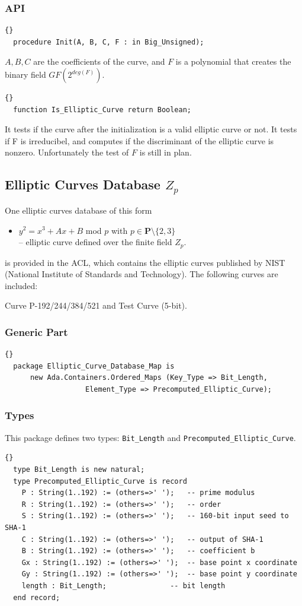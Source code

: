 \subsubsection*{API}
\begin{lstlisting}{}
  procedure Init(A, B, C, F : in Big_Unsigned);
\end{lstlisting}
$A,B,C$ are the coefficients of the curve, and $F$ is a polynomial
that creates the binary field $GF(2^{deg(F)})$.

\hhline

\begin{lstlisting}{}
  function Is_Elliptic_Curve return Boolean;
\end{lstlisting}
It tests if the curve after the initialization is a valid elliptic
curve or not. It tests if F is irreducibel, and computes if the
discriminant of the elliptic curve is nonzero. Unfortunately the test
of $F$ is still in plan.\\
\subsection{Elliptic Curves Database $Z_p$}
One elliptic curves database of this form
\begin{itemize}
\item $y^2 = x^3 + Ax + B$ mod $p$ with $p \in \textbf{P} \setminus \{2,3\}$ \\
      -- elliptic curve defined over the finite field $Z_p$.
\end{itemize}
is provided in the ACL, which contains the elliptic curves published
by NIST (National Institute of Standards and Technology). The
following curves are included: 
\begin{center}
Curve P-192/244/384/521 and Test Curve (5-bit).
\end{center}


\subsubsection*{Generic Part}
\begin{lstlisting}{}
  package Elliptic_Curve_Database_Map is
      new Ada.Containers.Ordered_Maps (Key_Type => Bit_Length,
                   Element_Type => Precomputed_Elliptic_Curve);
\end{lstlisting}
\subsubsection*{Types}
This package defines two types: \texttt{Bit\_Length} and \texttt{Precomputed\_Elliptic\_Curve}.
\begin{lstlisting}{}
  type Bit_Length is new natural;
  type Precomputed_Elliptic_Curve is record
    P : String(1..192) := (others=>' ');   -- prime modulus
    R : String(1..192) := (others=>' ');   -- order
    S : String(1..192) := (others=>' ');   -- 160-bit input seed to SHA-1
    C : String(1..192) := (others=>' ');   -- output of SHA-1
    B : String(1..192) := (others=>' ');   -- coefficient b
    Gx : String(1..192) := (others=>' ');  -- base point x coordinate
    Gy : String(1..192) := (others=>' ');  -- base point y coordinate
    length : Bit_Length;	           -- bit length
  end record;
\end{lstlisting}
